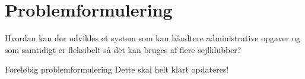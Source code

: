 \chapter{Problemformulering}\label{chap:problemformulering}

\cbstart

Hvordan kan der udvikles et system som kan håndtere administrative opgaver og som samtidigt er fleksibelt så det kan bruges af flere sejlklubber?

\begin{anfxnote}{Foreløbig problemformulering}
  Dette skal helt klart opdateres!
\end{anfxnote}

\cbend
